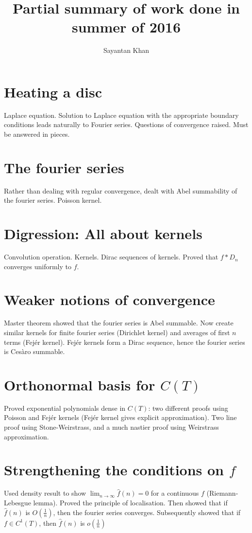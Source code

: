 \documentclass{article}
\title{Partial summary of work done in summer of 2016}
\author{Sayantan Khan}
\theoremstyle{definition}
\begin{document}
\maketitle

\section{Heating a disc}
Laplace equation. Solution to Laplace equation with the appropriate boundary conditions leads naturally to Fourier series. Questions of convergence raised. Must be answered in pieces.

\section{The fourier series}
Rather than dealing with regular convergence, dealt with Abel summability of the fourier series. Poisson kernel.

\section{Digression: All about kernels}
Convolution operation. Kernels. Dirac sequences of kernels. Proved that $f \ast D_n$ converges uniformly to $f$.

\section{Weaker notions of convergence}
Master theorem showed that the fourier series is Abel summable. Now create similar kernels for finite fourier series (Dirichlet kernel) and averages of first $n$ terms (Fejér kernel). Fejér kernels form a Dirac sequence, hence the fourier series is Cesàro summable.

\section{Orthonormal basis for $C(T)$}
Proved exponential polynomials dense in $C(T)$: two different proofs using Poisson and Fejér kernels (Fejér kernel gives explicit approximation). Two line proof using Stone-Weirstrass, and a much nastier proof using Weirstrass approximation.

\section{Strengthening the conditions on $f$}
Used density result to show $\displaystyle \lim_{n \rightarrow \infty} \hat{f}(n) = 0$ for a continuous $f$ (Riemann-Lebesgue lemma). Proved the principle of localisation. Then showed that if $\hat{f}(n)$ is $O\left( \frac{1}{n} \right)$, then the fourier series converges. Subsequently showed that if $f \in C^1(T)$, then $\hat{f}(n)$ is $o\left( \frac{1}{n} \right)$
\end{document}
